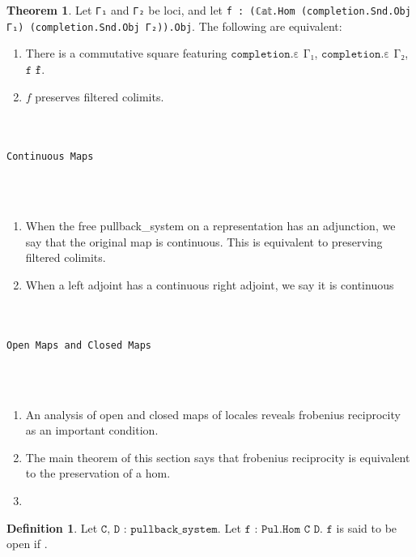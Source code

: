 \documentclass{book}
\theoremstyle{definition}
\newtheorem{definition}{Definition}
\newtheorem{theorem}{Theorem}
\newcounter{lcounter}
\renewcommand{\chapter}[1]{
\newpage
{
\Huge 
\begin{center}
\ \\
\ \\
\thispagestyle{empty}
\texttt{#1}
\end{center}}
\ \\
\ \\
}
\begin{document}
{{\begin{center}
\begin{tcolorbox}[width=5in,colback={white},title={\begin{center}\texttt{Lean \thelcounter} \addtocounter{lcounter}{1}  \end{center}},colbacktitle=Blue,coltitle=black]
\begin{verbatim}
\end{verbatim}
\end{tcolorbox}
\end{center}

\begin{theorem}
Let \texttt{Γ₁} and \texttt{Γ₂} be loci, and let \texttt{f : (ℂ𝕒𝕥.Hom (completion.Snd.Obj Γ₁) (completion.Snd.Obj Γ₂)).Obj}. The following are equivalent:
\begin{enumerate}
\item There is a commutative square featuring $\texttt{completion.ε Γ₁}$, $\texttt{completion.ε Γ₂}$, $\texttt{f}$ $\texttt{f̂}$.
\item $f$ preserves filtered colimits.
\end{enumerate}
\end{theorem}

\chapter{Continuous Maps}

\begin{enumerate}
\item When the free pullback_system on a representation has an adjunction, we say that the original map is continuous. This is equivalent to preserving filtered colimits.
\item When a left adjoint has a continuous right adjoint, we say it is continuous
\end{enumerate}

\chapter{Open Maps and Closed Maps}

\begin{enumerate}
\item An analysis of open and closed maps of locales reveals frobenius reciprocity as an important condition.
\item The main theorem of this section says that frobenius reciprocity is equivalent to the preservation of a hom.
\item 
\end{enumerate}

\begin{definition}
Let $\texttt{C, D : pullback\_system}$. Let $\texttt{f : Pul.Hom C D}$. $\texttt{f}$ is said to be open if . 
\end{definition}



}}
\end{document}
